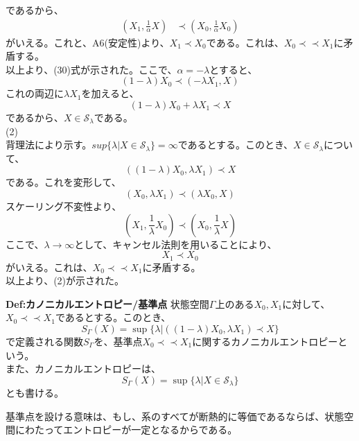 \documentclass[a4paper,11pt]{jsarticle}
\begin{document}
であるから、
\begin{align}
    (X_1,\frac{1}{\alpha}X) &\prec (X_0,\frac{1}{\alpha}X_0)
\end{align}
がいえる。これと、A6(安定性)より、$X_1 \prec X_0$である。これは、$X_0 \prec \prec X_1$に矛盾する。\\
以上より、(30)式が示された。ここで、$\alpha = -\lambda$とすると、
\begin{equation}
    (1-\lambda)X_0 \prec (-\lambda X_1,X)
\end{equation}
これの両辺に$\lambda X_1$を加えると、
\begin{equation}
    (1-\lambda)X_0 + \lambda X_1 \prec X
\end{equation}
であるから、$X \in \mathcal{S}_{\lambda}$である。\\
(2)\\
背理法により示す。$sup\{\lambda|X \in \mathcal{S}_{\lambda}\}=\infty$であるとする。このとき、$X\in \mathcal{S}_{\lambda}$について、
\begin{equation}
    ((1-\lambda)X_0,\lambda X_1) \prec X
\end{equation}
である。これを変形して、
\begin{equation}
    (X_0,\lambda X_1) \prec (\lambda X_0,X)
\end{equation}
スケーリング不変性より、
\begin{equation}
    (X_1,\frac{1}{\lambda}X_0) \prec (X_0,\frac{1}{\lambda}X)
\end{equation}  
ここで、$\lambda \rightarrow \infty$として、キャンセル法則を用いることにより、
\begin{equation}
    X_1 \prec X_0
\end{equation}
がいえる。これは、$X_0 \prec \prec X_1$に矛盾する。\\
以上より、(2)が示された。\qedsymbol\\

\begin{itembox}[l]{\textbf{Def:カノニカルエントロピー/基準点}}
    状態空間$\Gamma$上のある$X_0,X_1$に対して、$X_0 \prec \prec X_1$であるとする。このとき、
    \begin{equation}
        S_{\Gamma}(X) = \sup\{\lambda|((1-\lambda)X_0,\lambda X_1) \prec X\}
    \end{equation}
    で定義される関数$S_{\Gamma}$を、基準点$X_0 \prec \prec X_1$に関するカノニカルエントロピーという。\\
    また、カノニカルエントロピーは、
    \begin{equation}
        S_{\Gamma}(X) = \sup\{\lambda|X \in \mathcal{S}_{\lambda}\}
    \end{equation}
    とも書ける。
\end{itembox}
基準点を設ける意味は、もし、系のすべてが断熱的に等価であるならば、状態空間にわたってエントロピーが一定となるからである。\\
\end{document}
